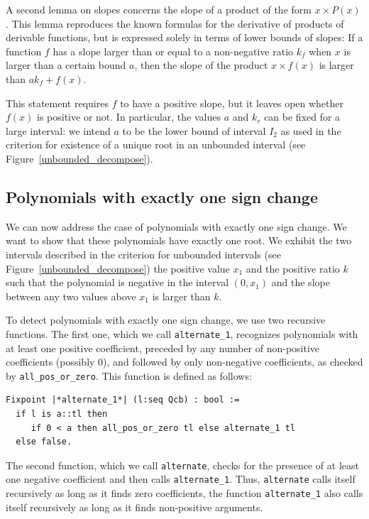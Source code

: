 \documentclass{mscs}
\begin{document}
A second lemma on slopes concerns the slope of a product of the form
\(x \times P(x)\).  This
lemma reproduces the known formulas for the derivative of products of derivable
functions, but is expressed solely in terms of lower bounds of slopes:
 If  a function \(f\) has a slope larger than or equal to a non-negative
ratio \(k_f\) when \(x\) is larger than a certain bound \(a\), 
then the slope of the product \(x \times f(x)\) is larger than
\(a k_f + f(x)\).

This statement requires \(f\) to have a positive slope, but it leaves open
whether \(f(x)\) is positive or not.  In particular, the values \(a\) and
\(k_r\) can be fixed for a large interval: we intend \(a\) to be the lower
bound of interval \(I_2\) as used in the criterion for existence of a unique
root in an unbounded interval (see Figure~\ref{unbounded_decompose}).

\subsection{Polynomials with exactly one sign change}
We can now address the case of polynomials with exactly one sign
change.  We want
to show that these polynomials have exactly one root.  We exhibit the
two intervals described in the criterion for unbounded intervals (see
Figure~\ref{unbounded_decompose}) the positive value \(x_1\) and the
positive ratio \(k\) such that the polynomial is negative in the
interval \((0, x_1)\) and the slope between any two values above
\(x_1\) is larger than \(k\).

To detect polynomials with exactly one sign change, we use two recursive
functions.  The first one, which we call {\tt alternate\_1}, recognizes
polynomials with at least one positive coefficient, preceded by any number
of non-positive coefficients (possibly 0), and followed by only non-negative
coefficients, as checked by {\tt all\_pos\_or\_zero}.  This function is
defined as follows:
\begin{lstlisting}
Fixpoint |*alternate_1*| (l:seq Qcb) : bool :=
  if l is a::tl then
     if 0 < a then all_pos_or_zero tl else alternate_1 tl
  else false.
\end{lstlisting}
The second function, which we call {\tt alternate}, checks for the
presence of at least one negative coefficient and then calls {\tt alternate\_1}.
Thus, {\tt alternate} calls itself recursively
as long as it finds zero coefficients, the function {\tt alternate\_1}
also calls itself recursively as long as it finds
non-positive arguments.
\end{document}
